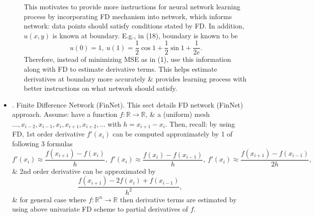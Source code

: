 \documentclass{article}
\begin{document}
\begin{itemize}
\begin{itemize}
		This motivates to provide more instructions for neural network learning process by incorporating FD mechanism into network, which informs network: data points should satisfy conditions stated by FD. In addition, $u(x,y)$ is known at boundary. E.g., in (18), boundary is known to be
		\begin{equation*}
			u(0) = 1,\ u(1) = \frac{1}{2}\cos1 + \frac{1}{2}\sin1 + \frac{1}{2e}.
		\end{equation*}
		Therefore, instead of minimizing MSE as in (1), use this information along with FD to estimate derivative terms. This helps estimate derivatives at boundary more accurately \& provides learning process with better instructions on what network should satisfy.
	\end{itemize}
	\item {. Finite Difference Network (FinNet).} This sect details FD network (FinNet) approach. Assume: have a function $f:\mathbb{R}\to\mathbb{R}$, \& a (uniform) mesh $\ldots,x_{i-2},x_{i-1},x_i,x_{i+1},x_{i+2},\ldots$ with $h = x_{i+1} - x_i$. Then, recall: by using FD, 1st order derivative $f'(x_i)$ can be computed approximately by 1 of following 3 formulas
	\begin{equation*}
		f'(x_i)\approx\frac{f(x_{i+1}) - f(x_i)}{h},\ f'(x_i)\approx\frac{f(x_i) - f(x_{i-1})}{h},\ f'(x_i)\approx\frac{f(x_{i+1}) - f(x_{i-1})}{2h},
	\end{equation*}
	\& 2nd order derivative can be approximated by
	\begin{equation*}
		\frac{f(x_{i+1}) - 2f(x_i) + f(x_{i-1})}{h^2},
	\end{equation*}
	\& for general case where $f:\mathbb{R}^n\to\mathbb{R}$ then derivative terms are estimated by using above univariate FD scheme to partial derivatives of $f$.


\end{itemize}
\end{document}
